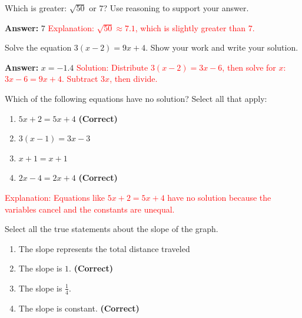 \documentclass[12pt]{article}
\begin{document}
\begin{tcolorbox}[colframe=black!50, colback=white, title=\textbf{Problem 6 (8.NS.A.2)}]
Which is greater: \( \sqrt{50} \) or \( 7 \)? Use reasoning to support your answer.

\textbf{Answer:} \(7\)  
\textcolor{red}{Explanation: \(\sqrt{50} \approx 7.1\), which is slightly greater than \(7\).}
\end{tcolorbox}

\begin{tcolorbox}[colframe=black!50, colback=white, title=\textbf{Problem 7 (8.EE.C.7)}]
Solve the equation \(3(x - 2) = 9x + 4\). Show your work and write your solution.

\textbf{Answer:} \(x = -1.4\)  
\textcolor{red}{Solution: Distribute \(3(x - 2) = 3x - 6\), then solve for \(x\): \(3x - 6 = 9x + 4\). Subtract \(3x\), then divide.}
\end{tcolorbox}

\begin{tcolorbox}[colframe=black!50, colback=white, title=\textbf{Problem 8 (8.EE.C.7)}]
Which of the following equations have no solution? Select all that apply:

\begin{enumerate}[label=(\Alph*)]
    \item \(5x + 2 = 5x + 4\) \textbf{(Correct)}  
    \item \(3(x - 1) = 3x - 3\)  
    \item \(x + 1 = x + 1\)  
    \item \(2x - 4 = 2x + 4\) \textbf{(Correct)}  
\end{enumerate}
\textcolor{red}{Explanation: Equations like \(5x + 2 = 5x + 4\) have no solution because the variables cancel and the constants are unequal.}
\end{tcolorbox}

\begin{tcolorbox}[colframe=black!50, colback=white, title=\textbf{Problem 9 (8.EE.B.5)}]
Select all the true statements about the slope of the graph.

\begin{enumerate}[label=(\Alph*)]
    \item The slope represents the total distance traveled  
    \item The slope is \(  1 \). \textbf{(Correct)}  
    \item The slope is \( \frac{1}{4} \).  
    \item The slope is constant. \textbf{(Correct)}  
\end{enumerate}
\end{tcolorbox}
\end{document}
